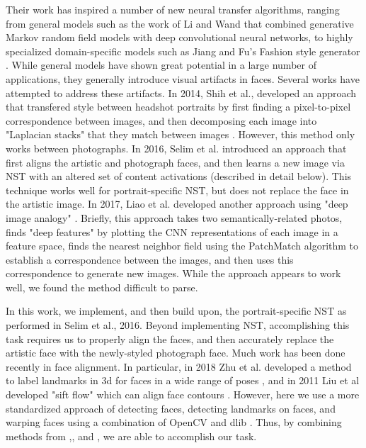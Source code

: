 \documentclass{article}
\begin{document}
Their work has inspired a number of new neural transfer algorithms, ranging from general models such as the work of Li and Wand \cite{li2016combining} that combined generative Markov random field models with deep convolutional neural networks, to highly specialized domain-specific models such as Jiang and Fu's Fashion style generator \cite{jiang2017fashion}. While general models have shown great potential in a large number of applications, they generally introduce visual artifacts in faces. Several works have attempted to address these artifacts. In 2014, Shih et al., developed an approach that transfered style between headshot portraits by first finding a pixel-to-pixel correspondence between images, and then decomposing each image into "Laplacian stacks" that they match between images \cite{Shih2014}. However, this method only works between photographs. In 2016, Selim et al. introduced an approach that first aligns the artistic and photograph faces, and then learns a new image via NST with an altered set of content activations \cite{selim2016painting} (described in detail below). This technique works well for portrait-specific NST, but does not replace the face in the artistic image. In 2017, Liao et al. developed another approach using "deep image analogy" \cite{Liao2017}. Briefly, this approach takes two semantically-related photos, finds "deep features" by plotting the CNN representations of each image in a feature space, finds the nearest neighbor field using the PatchMatch algorithm to establish a correspondence between the images, and then uses this correspondence to generate new images. While the approach appears to work well, we found the method difficult to parse. 

In this work, we implement, and then build upon, the portrait-specific NST as performed in Selim et al., 2016. Beyond implementing NST, accomplishing this task requires us to properly align the faces, and then accurately replace the artistic face with the newly-styled photograph face. Much work has been done recently in face alignment. In particular, in 2018 Zhu et al. developed a method to label landmarks in 3d for faces in a wide range of poses \cite{zhu2019face}, and in 2011 Liu et al developed "sift flow" which can align face contours \cite{siftflow}. However, here we use a more standardized approach of detecting faces, detecting landmarks on faces, and warping faces using a combination of OpenCV \cite{opencv_library} and dlib \cite{dlib09}. Thus, by combining methods from \cite{selim2016painting},\cite{opencv_library}, and \cite{dlib09}, we are able to accomplish our task.
\end{document}
